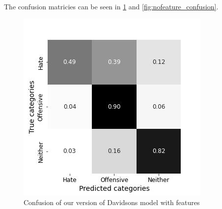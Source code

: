 \documentclass[11pt,a4paper]{article}
\begin{document}
\begin{table}
\caption{classification report for our reporduction of Davidsons model without features} 

\label{tab:davidson_nofeat}
\end{table}

The confusion matricies can be seen in \ref{fig:feature_confusion} and \ref{fig:nofeature_confusion}.

\begin{figure}[h]
  \includegraphics[width=\linewidth]{./tables-figures/feat_confusion.jpg}
  \caption{Confusion of our version of Davidsons model with features}
  \label{fig:feature_confusion}
\end{figure}
\end{document}

